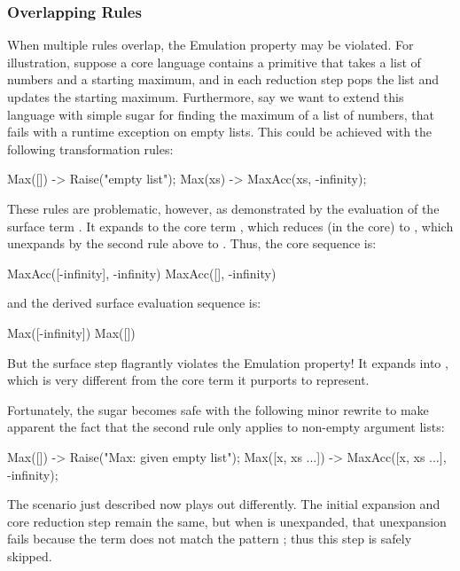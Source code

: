 \subsubsection{Overlapping Rules}
\label{sec:reval-overlapping}

When multiple rules overlap, the Emulation property may be violated.
For illustration,
suppose a core language contains a  primitive
that takes a list of numbers and a starting maximum, and in each reduction
step pops the list and updates the starting maximum. Furthermore, say
we want to extend this language with simple sugar for finding the maximum
of a list of numbers, that fails with a runtime exception on empty
lists. This could be achieved with the following transformation rules:
\begin{Codes}
Max([]) -> Raise("empty list");
Max(xs) -> MaxAcc(xs, -infinity);
\end{Codes}

These rules are problematic, however, as demonstrated by the evaluation of
the surface term . It expands to the core term
, which reduces (in the core)
to , which unexpands by the second rule above to
. Thus, the core sequence is:
\begin{Codes}
    MaxAcc([-infinity], -infinity)
\CoreStep MaxAcc([], -infinity)
\end{Codes}
and the derived surface evaluation sequence is:
\begin{Codes}
    Max([-infinity])
\SurfStep Max([])
\end{Codes}

But the  surface step flagrantly violates the Emulation
property! It expands into , which is very
different from the core term  it purports to
represent.

Fortunately, the  sugar becomes safe with the following minor
rewrite to make apparent the fact that the second rule only applies to
non-empty argument lists:
\begin{Codes}
Max([]) -> Raise("Max: given empty list");
Max([x, xs ...]) -> MaxAcc([x, xs ...], -infinity);
\end{Codes}
The scenario just described now plays out differently. The initial
expansion and core reduction step remain the same, but when
 is unexpanded, that unexpansion fails because
the term does not match the  pattern ; thus this step is safely skipped.


